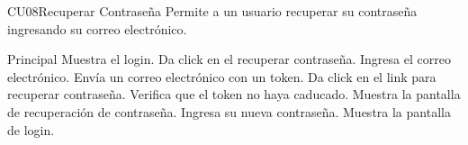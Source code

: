 
% 



	\begin{UseCase}{CU08}{Recuperar Contraseña}{
		Permite a un usuario recuperar su contraseña ingresando su correo electrónico.
	}
	\end{UseCase}
	\begin{UCtrayectoria}{Principal}
      \UCpaso  Muestra el login.
		\UCpaso[\UCactor]Da click en el recuperar contraseña.
		\UCpaso[\UCactor]Ingresa el correo electrónico.
      \UCpaso  Envía un correo electrónico con un token.
		\UCpaso[\UCactor]Da click en el link para recuperar contraseña. \label{token}
       \UCpaso   Verifica que el token no haya caducado. 
       \UCpaso   Muestra la pantalla de recuperación de contraseña.
		\UCpaso[\UCactor]Ingresa su nueva contraseña. \label{password}
       \UCpaso   Muestra la pantalla de login.
	\end{UCtrayectoria}

